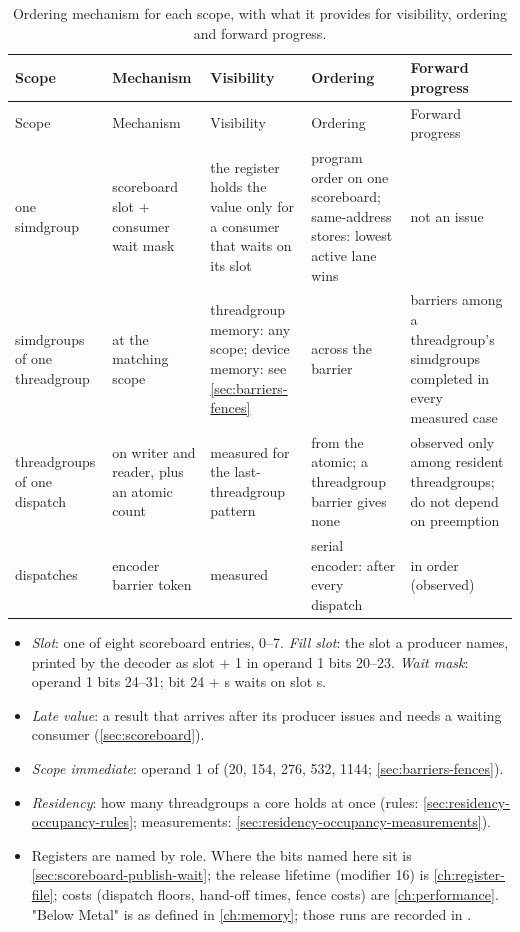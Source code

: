 \begin{xltabular}{\linewidth}{@{}>{\hsize}XX>{\hsize}XXX@{}}
\caption{Ordering mechanism for each scope, with what it provides for visibility, ordering and forward progress.}\label{tab:ordering-by-scope}\\
\toprule
Scope & Mechanism & Visibility & Ordering & Forward progress \\
\midrule
\endfirsthead
{}
\toprule
Scope & Mechanism & Visibility & Ordering & Forward progress \\
\midrule
\endhead
one simdgroup & scoreboard slot + consumer wait mask & the register holds the value only for a consumer that waits on its slot & program order on one scoreboard; same-address stores: lowest active lane
wins & not an issue \\*
simdgroups of one threadgroup &  at the matching scope & threadgroup memory: any scope; device memory: see 
\cref{sec:barriers-fences} & across the barrier & barriers among a threadgroup's simdgroups completed in
every measured case \\*
threadgroups of one dispatch &  on writer and reader, plus an atomic count & measured for the last-threadgroup pattern & from the atomic; a threadgroup barrier gives none & observed only among resident threadgroups; do not depend on preemption \\*
dispatches & encoder barrier token & measured & serial encoder: after every dispatch & in order (observed) \\*
\bottomrule
\end{xltabular}


\begin{itemize}
\item \emph{Slot}: one of eight scoreboard entries, 0–7. \emph{Fill slot}: the slot a producer names, printed by the decoder as slot +
  1 in operand 1 bits 20–23. \emph{Wait mask}: operand 1 bits 24–31; bit 24 + s waits on slot s.
\item \emph{Late value}: a result that arrives after its producer issues and needs a waiting consumer (\cref{sec:scoreboard}).
\item \emph{Scope immediate}: operand 1 of  (20, 154, 276, 532, 1144; \cref{sec:barriers-fences}).
\item \emph{Residency}: how many threadgroups a core holds at once (rules: \cref{sec:residency-occupancy-rules}; measurements: \cref{sec:residency-occupancy-measurements}).
\item Registers are named by role. Where the bits named here sit is \cref{sec:scoreboard-publish-wait}; the release lifetime (modifier 16) is
  \cref{ch:register-file}; costs (dispatch floors, hand-off times, fence costs) are \cref{ch:performance}. "Below Metal" is as defined in
  \cref{ch:memory}; those runs are recorded in .
\end{itemize}

